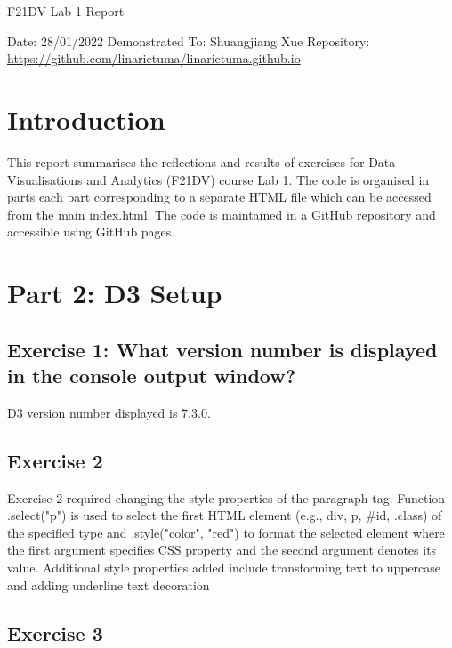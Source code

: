 \documentclass[11pt]{article}   	%
\begin{document}
\begin{center}
  \Huge{F21DV Lab 1 Report}
\end{center}
Date: 28/01/2022 \linebreak
Demonstrated To: Shuangjiang  Xue \linebreak
Repository: \url{https://github.com/linarietuma/linarietuma.github.io} 

\section{Introduction}

This report summarises the reflections and results of exercises for Data Visualisations and Analytics (F21DV) course Lab 1. The code is organised in parts each part corresponding to a separate HTML file which can be accessed from the main index.html. The code is maintained in a GitHub repository and accessible using GitHub pages.

\section{Part 2: D3 Setup}
\subsection{Exercise 1: What version number is displayed in the console output window?}
\vspace{-1em}

D3 version number displayed is 7.3.0.

\subsection{Exercise 2 }
\vspace{-1em}

Exercise 2 required changing the style properties of the paragraph tag. Function .select("p") is used to select the first HTML element (e.g., div, p, \#id, .class) of the specified type and .style("color", "red") to format the selected element where the first argument specifies CSS property and the second argument denotes its value. Additional style properties added include transforming text to uppercase and adding underline text decoration

\subsection{Exercise 3 }
\vspace{-1em}
\end{document}

